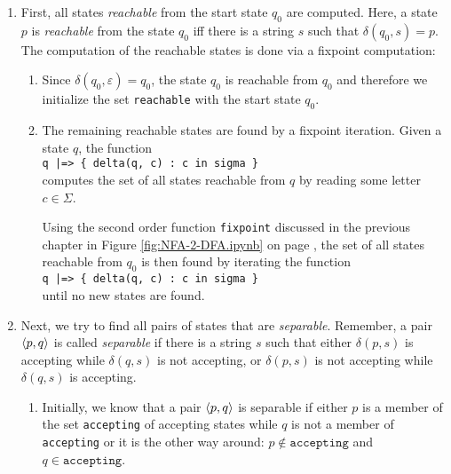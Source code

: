 \begin{enumerate}
\item First, all states \emph{reachable} from the start state $q_0$ are computed.
      Here, a state $p$ is \emph{reachable} from the state $q_0$ iff there is a string $s$
      such that $\delta(q_0, s) = p$.
      The computation of the reachable states is done via a fixpoint computation:
      \begin{enumerate}
      \item Since $\delta(q_0, \varepsilon) = q_0$, the state $q_0$ is reachable from $q_0$
            and therefore we initialize the set \texttt{reachable} with the 
            start state $q_0$.
      \item The remaining reachable states are found by a fixpoint iteration.
            Given a state $q$, the function
            \\[0.2cm]
            \hspace*{1.3cm}
            \texttt{q |=> \{ delta(q, c) : c in sigma \}}
            \\[0.2cm]
            computes the set of all states reachable from $q$ by reading some letter $c \in \Sigma$.

            Using the second order function \texttt{fixpoint} discussed in the previous chapter in
            Figure \ref{fig:NFA-2-DFA.ipynb} on page \pageref{fig:NFA-2-DFA.ipynb}, the set of all
            states reachable from $q_0$ is then found by iterating the function 
            \\[0.2cm]
            \hspace*{1.3cm}
            \texttt{q |=> \{ delta(q, c) : c in sigma \}}
            \\[0.2cm]
            until no new states are found.
      \end{enumerate}
\item Next, we try to find all pairs of states that are \emph{separable}. Remember, 
      a pair $\pair(p, q)$ is called \emph{separable} if there is a string $s$ such
      that either $\delta(p,s)$ is accepting while $\delta(q,s)$ is not accepting, or
      $\delta(p,s)$ is not accepting while $\delta(q,s)$ is accepting.  
      \begin{enumerate}
      \item Initially, we know that a pair $\pair(p, q)$ is separable if either
            $p$ is a member of the set \texttt{accepting} of accepting states while $q$
            is not a member of \texttt{accepting} or it is the other way around:
            $p \not\in \mathtt{accepting}$ and $q \in \mathtt{accepting}$.


\end{enumerate}
\end{enumerate}
